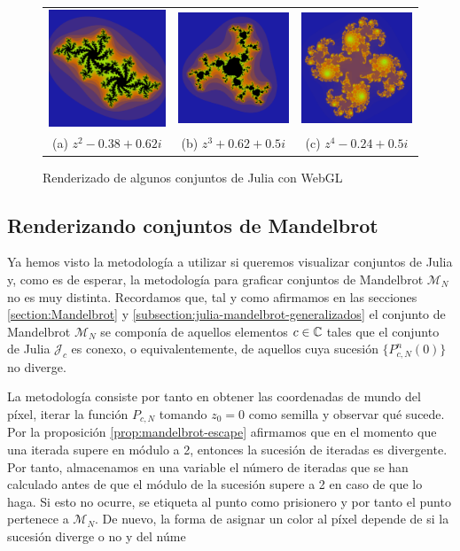 \begin{figure}[ht]
    \centering
    \begin{tabular}{ccc}
      \includegraphics[scale=0.2]{img/C6/julia-1.png} &   \includegraphics[scale=0.2]{img/C6/julia-2.png} &   \includegraphics[scale=0.2]{img/C6/julia-3.png} \\
    (a) $z^2-0.38+0.62i$ & (b) $z^3+0.62+0.5i$ & (c) $z^4-0.24+0.5i$ \\[6pt]
    \end{tabular}
    \caption{Renderizado de algunos conjuntos de Julia con WebGL}
    \label{fig:julia-webgl}
\end{figure}

\subsection{Renderizando conjuntos de Mandelbrot}

Ya hemos visto la metodología a utilizar si queremos visualizar conjuntos de Julia y, como es de esperar, la metodología para graficar conjuntos de Mandelbrot $\mathcal{M}_N$ no es muy distinta. Recordamos que, tal y como afirmamos en las secciones \ref{section:Mandelbrot} y \ref{subsection:julia-mandelbrot-generalizados} el conjunto de Mandelbrot $\mathcal{M}_N$ se componía de aquellos elementos $c\in\mathbb{C}$ tales que el conjunto de Julia $\mathcal{J}_c$ es conexo, o equivalentemente, de aquellos cuya sucesión $\{P_{c,N}^n(0)\}$ no diverge.

La metodología consiste por tanto en obtener las coordenadas de mundo del píxel, iterar la función $P_{c,N}$ tomando $z_0=0$ como semilla y observar qué sucede. Por la proposición \ref{prop:mandelbrot-escape} afirmamos que en el momento que una iterada supere en módulo a 2, entonces la sucesión de iteradas es divergente. Por tanto, almacenamos en una variable el número de iteradas que se han calculado antes de que el módulo de la sucesión supere a 2 en caso de que lo haga. Si esto no ocurre, se etiqueta al punto como prisionero y por tanto el punto pertenece a $\mathcal{M}_N$. De nuevo, la forma de asignar un color al píxel depende de si la sucesión diverge o no y del núme